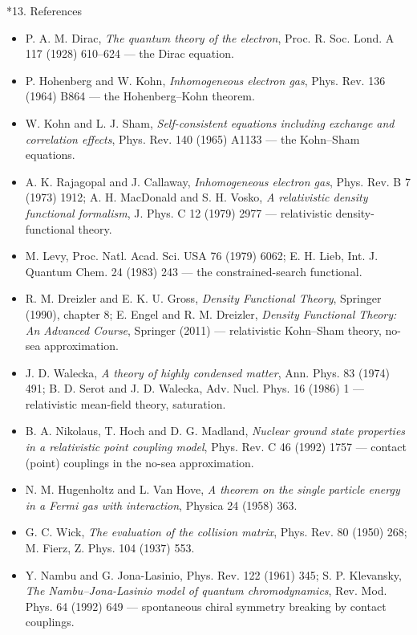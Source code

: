 \documentclass[10pt,a4paper]{article}
\makeatletter
\renewcommand\section{\@startsection{section}{1}{\z@}{-3.5ex \@plus -1ex \@minus -.2ex}{2.3ex \@plus.2ex}{\normalfont\Large\bfseries\raggedright}}
\makeatother
\begin{document}
\section*{13. References}
\begin{itemize}
\item P. A. M. Dirac, \emph{The quantum theory of the electron}, Proc. R. Soc. Lond. A 117 (1928) 610–624 — the Dirac equation.
\item P. Hohenberg and W. Kohn, \emph{Inhomogeneous electron gas}, Phys. Rev. 136 (1964) B864 — the Hohenberg–Kohn theorem.
\item W. Kohn and L. J. Sham, \emph{Self-consistent equations including exchange and correlation effects}, Phys. Rev. 140 (1965) A1133 — the Kohn–Sham equations.
\item A. K. Rajagopal and J. Callaway, \emph{Inhomogeneous electron gas}, Phys. Rev. B 7 (1973) 1912; A. H. MacDonald and S. H. Vosko, \emph{A relativistic density functional formalism}, J. Phys. C 12 (1979) 2977 — relativistic density-functional theory.
\item M. Levy, Proc. Natl. Acad. Sci. USA 76 (1979) 6062; E. H. Lieb, Int. J. Quantum Chem. 24 (1983) 243 — the constrained-search functional.
\item R. M. Dreizler and E. K. U. Gross, \emph{Density Functional Theory}, Springer (1990), chapter 8; E. Engel and R. M. Dreizler, \emph{Density Functional Theory: An Advanced Course}, Springer (2011) — relativistic Kohn–Sham theory, no-sea approximation.
\item J. D. Walecka, \emph{A theory of highly condensed matter}, Ann. Phys. 83 (1974) 491; B. D. Serot and J. D. Walecka, Adv. Nucl. Phys. 16 (1986) 1 — relativistic mean-field theory, saturation.
\item B. A. Nikolaus, T. Hoch and D. G. Madland, \emph{Nuclear ground state properties in a relativistic point coupling model}, Phys. Rev. C 46 (1992) 1757 — contact (point) couplings in the no-sea approximation.
\item N. M. Hugenholtz and L. Van Hove, \emph{A theorem on the single particle energy in a Fermi gas with interaction}, Physica 24 (1958) 363.
\item G. C. Wick, \emph{The evaluation of the collision matrix}, Phys. Rev. 80 (1950) 268; M. Fierz, Z. Phys. 104 (1937) 553.
\item Y. Nambu and G. Jona-Lasinio, Phys. Rev. 122 (1961) 345; S. P. Klevansky, \emph{The Nambu–Jona-Lasinio model of quantum chromodynamics}, Rev. Mod. Phys. 64 (1992) 649 — spontaneous chiral symmetry breaking by contact couplings.

\end{itemize}
\end{document}
